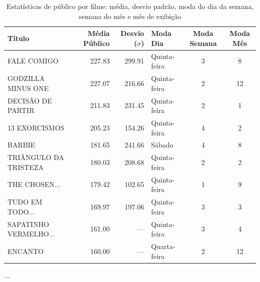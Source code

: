 \documentclass{article}
\begin{document}
\begin{table}[H]
\centering
\caption{Estatísticas de público por filme: média, desvio padrão, moda do dia da semana, semana do mês e mês de exibição}
\begin{small}
\begin{tabularx}{\textwidth}{X r r l c c}
\hline
\textbf{Título} & \textbf{Média Público} & \textbf{Desvio ($\sigma$)} & \textbf{Moda Dia} & \textbf{Moda Semana} & \textbf{Moda Mês} \\
\hline
FALE COMIGO & 227.83 & 299.91 & Quinta-feira & 3 & 8 \\
GODZILLA MINUS ONE & 227.07 & 216.66 & Quinta-feira & 2 & 12 \\
DECISÃO DE PARTIR & 211.83 & 231.45 & Quinta-feira & 2 & 1 \\
13 EXORCISMOS & 205.23 & 154.26 & Quinta-feira & 4 & 2 \\
BARBIE & 181.65 & 241.66 & Sábado & 4 & 8 \\
TRIÂNGULO DA TRISTEZA & 180.03 & 208.68 & Quinta-feira & 2 & 2 \\
THE CHOSEN... & 179.42 & 102.65 & Quinta-feira & 1 & 9 \\
TUDO EM TODO... & 169.97 & 197.06 & Quinta-feira & 3 & 3 \\
SAPATINHO VERMELHO... & 161.00 & --- & Quinta-feira & 3 & 4 \\
ENCANTO & 160.00 & --- & Quarta-feira & 2 & 12 \\

\end{tabularx}
\end{small}
\begin{center}
$\ldots$
\end{center}
\end{table}

\lipsum[1] %
\end{document}
